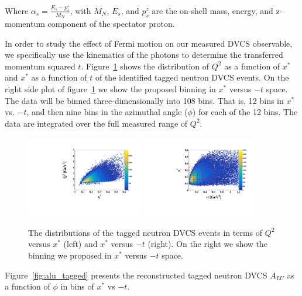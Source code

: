 Where $\alpha_s = \frac{E_s - p^{z}_{s}}{M_N}$, with $M_N$, $E_s$, and 
$p^{z}_{s}$ are the on-shell mass, energy, and z-momentum component of the 
spectator proton. 


In order to study the effect of Fermi motion on our measured DVCS observable, 
we specifically use the kinematics of the photons to determine the transferred 
momentum squared $t$.  Figure~\ref{fig:binning_x_t} shows the distribution of 
$Q^2$ as a function of $x^*$ and $x^*$ as a function of $t$ of the identified 
tagged neutron DVCS events. On the right side plot of 
figure~\ref{fig:binning_x_t} we show the proposed binning in $x^{*}$ versus 
$-t$ space. The data will be binned three-dimensionally into 108 bins. That is, 
12 bins in $x^{*}$ vs. $-t$, and then nine bins in the azimuthal angle ($\phi$) 
for each of the 12 bins. The data are integrated over the full measured range 
of $Q^2$.   
   

\begin{figure}[htb]
  \centering
    \includegraphics[width=0.45\textwidth,clip]{figs/pdf/Q2_x*.pdf}
    \includegraphics[width=0.45\textwidth,clip]{figs/pdf/t_x*.pdf}
   \caption{The distributions of the tagged neutron DVCS events in terms of 
   $Q^2$ versus $x^*$ (left) and  $x^{*}$ versus $-t$ (right). On the right we 
   show the binning we proposed in $x^{*}$ versus $-t$ space.
   \label{fig:binning_x_t}}
\end{figure}


Figure~\ref{fig:alu_tagged} presents the reconstructed tagged neutron DVCS  
$A_{LU}$ as a function of $\phi$ in bins of $x^{*}$ vs $-t$.  

